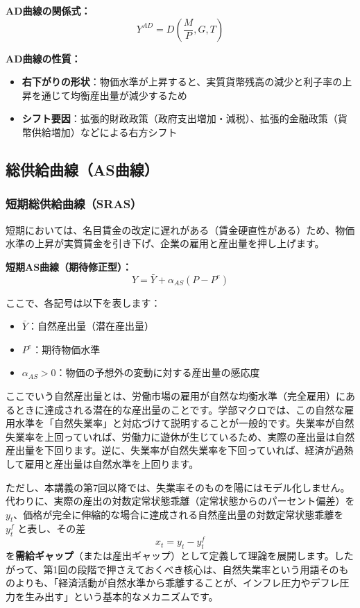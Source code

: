 \documentclass[
  japanese,
  lualatex,
  ja=standard,
  12pt,
  a4paper]{ltjsarticle}
\providecommand{\tightlist}{%
  \setlength{\itemsep}{0pt}\setlength{\parskip}{0pt}}
\begin{document}
\textbf{AD曲線の関係式：} \[
Y^{AD}=D\left(\frac{M}{P}, G, T\right)
\]

\textbf{AD曲線の性質：}

\begin{itemize}
\tightlist
\item
  \textbf{右下がりの形状}：物価水準が上昇すると、実質貨幣残高の減少と利子率の上昇を通じて均衡産出量が減少するため
\item
  \textbf{シフト要因}：拡張的財政政策（政府支出増加・減税）、拡張的金融政策（貨幣供給増加）などによる右方シフト
\end{itemize}

\subsection{総供給曲線（AS曲線）}\label{ux7dcfux4f9bux7d66ux66f2ux7ddaasux66f2ux7dda}

\subsubsection{短期総供給曲線（SRAS）}\label{ux77edux671fux7dcfux4f9bux7d66ux66f2ux7ddasras}

短期においては、名目賃金の改定に遅れがある（賃金硬直性がある）ため、物価水準の上昇が実質賃金を引き下げ、企業の雇用と産出量を押し上げます。

\textbf{短期AS曲線（期待修正型）：} \[
Y = \bar{Y} + \alpha_{AS}(P - P^e)
\]

ここで、各記号は以下を表します：

\begin{itemize}
\tightlist
\item
  \(\bar{Y}\)：自然産出量（潜在産出量）
\item
  \(P^e\)：期待物価水準
\item
  \(\alpha_{AS} > 0\)：物価の予想外の変動に対する産出量の感応度
\end{itemize}

ここでいう自然産出量とは、労働市場の雇用が自然な均衡水準（完全雇用）にあるときに達成される潜在的な産出量のことです。学部マクロでは、この自然な雇用水準を「自然失業率」と対応づけて説明することが一般的です。失業率が自然失業率を上回っていれば、労働力に遊休が生じているため、実際の産出量は自然産出量を下回ります。逆に、失業率が自然失業率を下回っていれば、経済が過熱して雇用と産出量は自然水準を上回ります。

ただし、本講義の第7回以降では、失業率そのものを陽にはモデル化しません。代わりに、実際の産出の対数定常状態乖離（定常状態からのパーセント偏差）を
\(y_t\)、価格が完全に伸縮的な場合に達成される自然産出量の対数定常状態乖離を
\(y_t^f\) と表し、その差 \[
x_t = y_t-y_t^f
\]
を\textbf{需給ギャップ}（または産出ギャップ）として定義して理論を展開します。したがって、第1回の段階で押さえておくべき核心は、自然失業率という用語そのものよりも、「経済活動が自然水準から乖離することが、インフレ圧力やデフレ圧力を生み出す」という基本的なメカニズムです。
\end{document}
